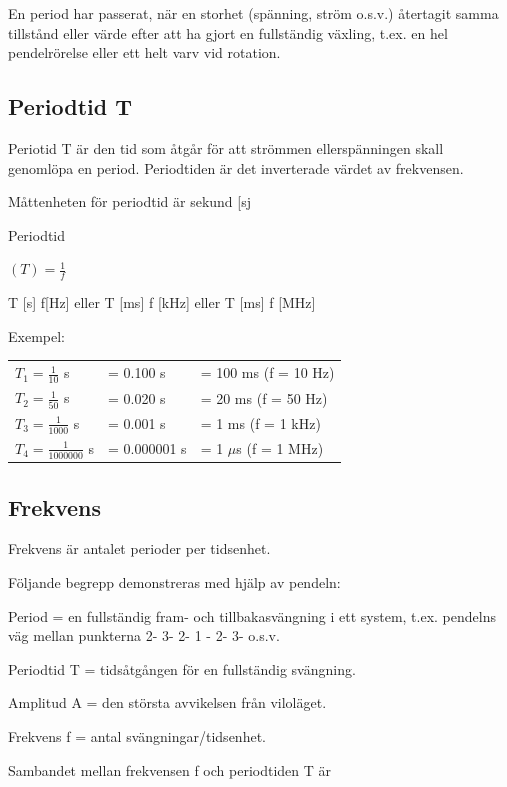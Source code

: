 En period har passerat, när en storhet (spänning, ström o.s.v.) återtagit samma tillstånd
eller värde efter att ha gjort en fullständig växling, t.ex. en hel pendelrörelse eller ett
helt varv vid rotation.

\subsection{Periodtid T}

Periotid T är den tid som åtgår för att strömmen ellerspänningen skall genomlöpa
en period. Periodtiden är det inverterade värdet av frekvensen.

Måttenheten för periodtid är sekund [sj

Periodtid

\((T) = \frac{1}{f}\)

T [s] f[Hz] eller
T [ms] f [kHz] eller
T [ms] f [MHz]

Exempel:

\begin{center}
\begin{tabular}{lll}
\(T_1=\frac{1}{10}\) s & = 0.100 s & = 100 ms (f = 10 Hz)\\
\(T_2=\frac{1}{50}\) s & = 0.020 s & = 20 ms (f = 50 Hz)\\
\(T_3=\frac{1}{1000}\) s & = 0.001 s & = 1 ms (f = 1 kHz)\\
\(T_4=\frac{1}{1000000}\) s & = 0.000001 s & = 1 \(\mu\)s (f = 1 MHz)\\
\end{tabular}
\end{center}

\subsection{Frekvens}

Frekvens är antalet perioder per tidsenhet.

Följande begrepp demonstreras med hjälp av pendeln:

Period = en fullständig fram- och tillbakasvängning i ett system, t.ex. pendelns väg
mellan punkterna 2- 3- 2- 1 - 2- 3- o.s.v.

Periodtid T = tidsåtgången för en fullständig svängning.

Amplitud A = den största avvikelsen från viloläget.

Frekvens f = antal svängningar/tidsenhet.

Sambandet mellan frekvensen f och periodtiden T är

